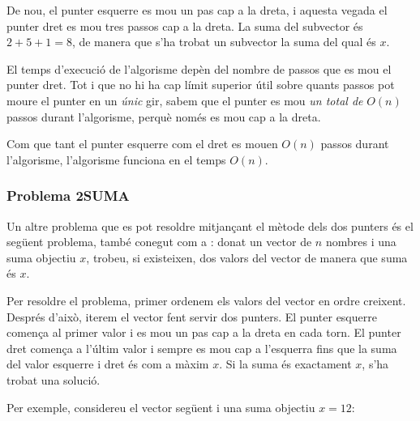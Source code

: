 De nou, el punter esquerre es mou un pas cap a la dreta, i aquesta
vegada el punter dret es mou tres passos cap a la dreta. La suma del
subvector és $2+5+1=8$, de manera que s'ha trobat un subvector la suma
del qual és $x$.


\begin{center}
\end{center}


El temps d'execució de l'algorisme depèn del nombre de passos que es
mou el punter dret. Tot i que no hi ha cap límit superior útil sobre
quants passos pot moure el punter en un \emph{únic} gir, sabem que el
punter es mou \emph{un total de} $O(n)$ passos durant l'algorisme, perquè
només es mou cap a la dreta.

Com que tant el punter esquerre com el dret es mouen $O(n)$ passos durant
l'algorisme, l'algorisme funciona en el temps $O(n)$.

\subsubsection{Problema 2SUMA}


Un altre problema que es pot resoldre mitjançant el mètode dels dos
punters és el següent problema, també conegut com a :
donat un vector de $n$ nombres i una suma objectiu $x$,
trobeu, si existeixen, dos valors del vector de manera que suma és $x$.

Per resoldre el problema, primer ordenem els valors del vector en
ordre creixent. Després d'això, iterem el vector fent servir dos
punters. El punter esquerre comença al primer valor i es mou un pas
cap a la dreta en cada torn. El punter dret comença a l'últim valor i
sempre es mou cap a l'esquerra fins que la suma del valor esquerre i
dret és com a màxim $x$. Si la suma és exactament $x$, s'ha trobat una
solució.

Per exemple, considereu el vector següent i una suma objectiu $x=12$:
\begin{center}
\end{center}


